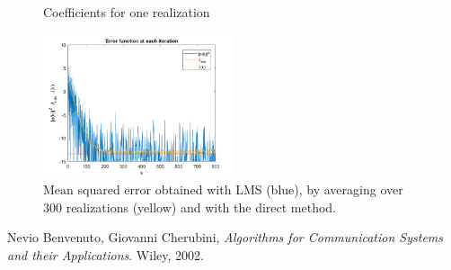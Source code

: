 \documentclass[a4paper, 12pt]{report}
\begin{document}
\begin{figure}[H]
	\centering
	\caption{Coefficients for one realization}
	\label{fig:coeff1}
\end{figure}

\begin{figure}[H]
	\centering
	\includegraphics[width=0.5\textwidth]{err_lms}
	\caption{Mean squared error obtained with LMS (blue), by averaging over 300 realizations (yellow) and with the direct method.}
	\label{fig:err_lms}
\end{figure}

\begin{thebibliography}{15}
	Nevio Benvenuto, Giovanni Cherubini,
	\textit{Algorithms for Communication Systems and their Applications}. 
	Wiley, 2002.
\end{thebibliography}
\end{document}
